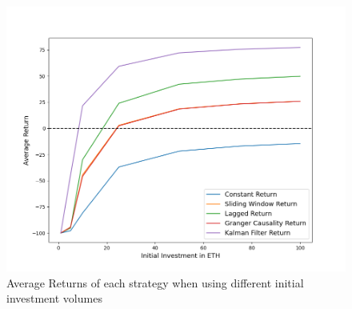 \begin{figure}[H]
    \centering
    \includegraphics[width=\linewidth]{evaluation/Images/VaryII.png}
    \caption{Average Returns of each strategy when using different initial investment volumes}
    \label{fig:VaryInitialInvestments}
\end{figure}

